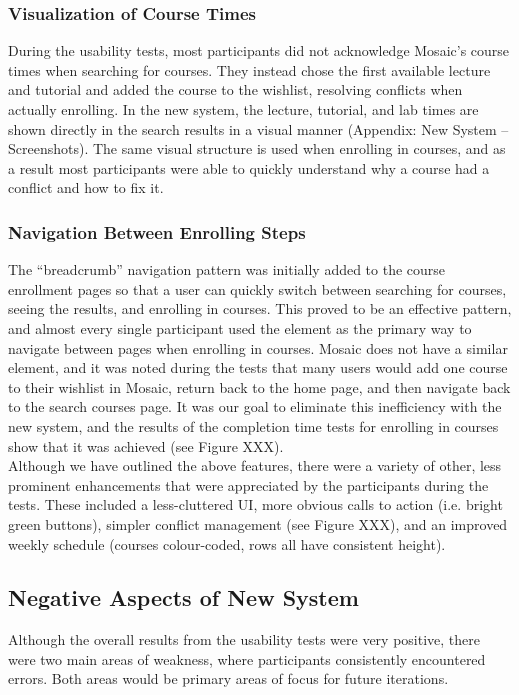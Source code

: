 \documentclass[10pt]{article}
\begin{document}
\begin{multicols}{2}
\subsubsection*{Visualization of Course Times}
During the usability tests, most participants did not acknowledge Mosaic's course times when searching for courses. They instead chose the first available lecture and tutorial and added the course to the wishlist, resolving conflicts when actually enrolling. In the new system, the lecture, tutorial, and lab times are shown directly in the search results in a visual manner (Appendix: New System -- Screenshots). The same visual structure is used when enrolling in courses, and as a result most participants were able to quickly understand why a course had a conflict and how to fix it.

\subsubsection*{Navigation Between Enrolling Steps}
The ``breadcrumb'' navigation pattern was initially added to the course enrollment pages so that a user can quickly switch between searching for courses, seeing the results, and enrolling in courses. This proved to be an effective pattern, and almost every single participant used the element as the primary way to navigate between pages when enrolling in courses. Mosaic does not have a similar element, and it was noted during the tests that many users would add one course to their wishlist in Mosaic, return back to the home page, and then navigate back to the search courses page. It was our goal to eliminate this inefficiency with the new system, and the results of the completion time tests for enrolling in courses show that it was achieved (see Figure XXX).\\

Although we have outlined the above features, there were a variety of other, less prominent enhancements that were appreciated by the participants during the tests. These included a less-cluttered UI, more obvious calls to action (i.e. bright green buttons), simpler conflict management (see Figure XXX), and an improved weekly schedule (courses colour-coded, rows all have consistent height).

\subsection*{Negative Aspects of New System}
Although the overall results from the usability tests were very positive, there were two main areas of weakness, where participants consistently encountered errors. Both areas would be primary areas of focus for future iterations.


\end{multicols}
\end{document}
